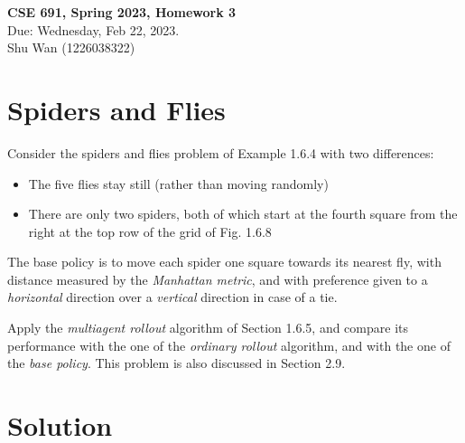 \documentclass[11pt]{article}
\begin{document}
\begin{center}
\Large{
\textbf{CSE 691, Spring 2023, Homework 3} \\
Due: Wednesday, Feb 22, 2023. \\
Shu Wan (1226038322)
}
\end{center}

\section*{Spiders and Flies}
Consider the spiders and flies problem of Example 1.6.4 with two differences:
\begin{itemize}
    \item The five flies stay still (rather than moving randomly)
    \item There are only two spiders, both of which start at the fourth square from the right at the top row of the grid of Fig. 1.6.8
\end{itemize}

The base policy is to move each spider one square towards its nearest fly, with distance measured by the \emph{Manhattan metric}, and with preference given to a \emph{horizontal} direction over a \emph{vertical} direction in case of a tie. 

Apply the \emph{multiagent rollout} algorithm of Section 1.6.5, and compare its performance with the one of the \emph{ordinary rollout} algorithm, and with the one of the \emph{base policy}. This problem is also discussed in Section 2.9.

\section*{Solution}
\end{document}
